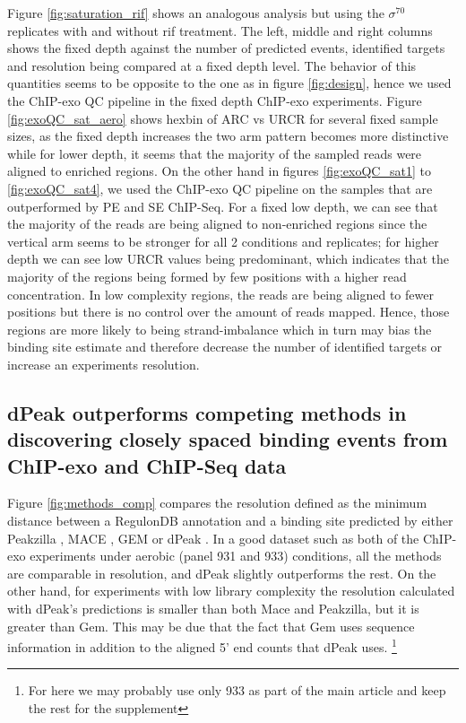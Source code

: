 \documentclass{bmcart}\usepackage[]{graphicx}\usepackage[]{color}
\newcommand{\sig}{\sigma^{70}}
\begin{document}
Figure \ref{fig:saturation_rif} shows an analogous analysis but using
the $\sig$ replicates with and without rif treatment. The left, middle
and right columns shows the fixed depth against the number of
predicted events, identified targets and resolution being compared at
a fixed depth level. The behavior of this quantities seems to be
opposite to the one as in figure \ref{fig:design}, hence we used the
ChIP-exo QC pipeline in the fixed depth ChIP-exo experiments. Figure
\ref{fig:exoQC_sat_aero} shows hexbin of ARC vs URCR for several fixed
sample sizes, as the fixed depth increases the two arm pattern becomes
more distinctive while for lower depth, it seems that the majority of
the sampled reads were aligned to enriched regions. On the other hand
in figures \ref{fig:exoQC_sat1} to \ref{fig:exoQC_sat4}, we used the
ChIP-exo QC pipeline on the samples that are outperformed by PE and SE
ChIP-Seq. For a fixed low depth, we can see that the majority of the
reads are being aligned to non-enriched regions since the vertical arm
seems to be stronger for all 2 conditions and replicates; for higher
depth we can see low URCR values being predominant, which indicates
that the majority of the regions being formed by few positions with a
higher read concentration. In low complexity regions, the reads are
being aligned to fewer positions but there is no control over the
amount of reads mapped. Hence, those regions are more likely to being
strand-imbalance which in turn may bias the binding site estimate and
therefore decrease the number of identified targets or increase an
experiments resolution.


\subsection{dPeak outperforms competing methods in discovering closely
  spaced binding events from ChIP-exo and ChIP-Seq data}

Figure \ref{fig:methods_comp} compares the resolution defined as the
minimum distance between a RegulonDB annotation and a binding site
predicted by either Peakzilla \cite{peakzilla}, MACE \cite{mace}, GEM
\cite{gem} or dPeak \cite{dpeak}. In a good dataset such as both of
the ChIP-exo experiments under aerobic (panel 931 and 933) conditions,
all the methods are comparable in resolution, and dPeak slightly
outperforms the rest. On the other hand, for experiments with low
library complexity the resolution calculated with dPeak's predictions
is smaller than both Mace and Peakzilla, but it is greater than
Gem. This may be due that the fact that Gem uses sequence information
in addition to the aligned 5' end counts that dPeak uses. \footnote{For
  here we may probably use only 933 as part of the main article and
  keep the rest for the supplement}
\end{document}
